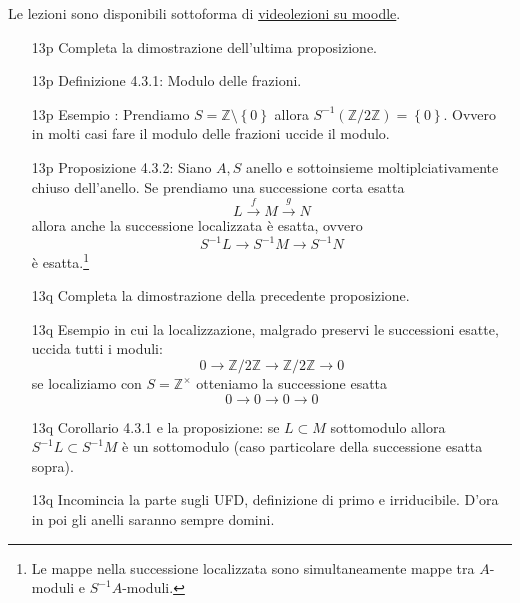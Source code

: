 \documentclass[italian]{article}
\begin{document}
	Le lezioni sono disponibili sottoforma di 
	\href{https://didatticaonline.unitn.it/dol/course/view.php?id=23268}{videolezioni
		su moodle}.
	
	\begin{enumerate}
      \item[13p] Completa la dimostrazione dell'ultima proposizione.
      \item[13p] Definizione 4.3.1\cite{vergura}: Modulo delle frazioni. 
      \item[13p] Esempio : Prendiamo $S = \mathbb{Z} \setminus \left\{ 0
        \right\}$ allora $S^{-1}(\mathbb{Z}/2\mathbb{Z}) = \left\{ 0 \right\}$.
        Ovvero in molti casi fare il modulo delle frazioni uccide il modulo.
      \item[13p] Proposizione 4.3.2\cite{vergura}: Siano $A,S$ anello e 
        sottoinsieme moltiplciativamente chiuso dell'anello. 
        Se prendiamo una successione corta esatta 
        \begin{equation*}
          L \xrightarrow{f} M \xrightarrow{g} N
        \end{equation*}
        allora anche la successione localizzata è esatta, ovvero
        \begin{equation*}
          S^{-1}L \to S^{-1}M \to S^{-1}N
        \end{equation*}
        è esatta.\footnote{Le mappe nella successione localizzata sono
        simultaneamente mappe tra $A$-moduli e $S^{-1}A$-moduli.}
      \item[13q] Completa la dimostrazione della precedente proposizione.
      \item[13q] Esempio in cui la localizzazione, malgrado preservi le
        successioni esatte, uccida tutti i moduli:
        \begin{equation*}
          0 \to  \mathbb{Z}/2 \mathbb{Z} \to  \mathbb{Z}/2\mathbb{Z} \to 0
        \end{equation*}
        se localiziamo con $S = \mathbb{Z}^{\times}$ otteniamo la successione
        esatta
        \begin{equation*}
          0 \to 0 \to 0 \to 0
        \end{equation*}
      \item[13q] Corollario 4.3.1 e la proposizione: se $L \subset M$ sottomodulo 
        allora $S^{-1}L \subset S^{-1}M$ è un sottomodulo 
        (caso particolare della successione esatta sopra).
      \item[13q] Incomincia la parte sugli UFD, definizione di primo
        e irriducibile. D'ora in poi gli anelli saranno sempre domini.

\end{enumerate}
\end{document}
